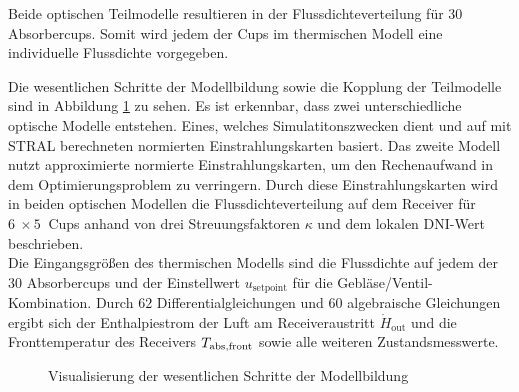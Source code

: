 Beide optischen Teilmodelle resultieren in der Flussdichteverteilung für $30$ Absorbercups.
Somit wird jedem der Cups im thermischen Modell eine individuelle Flussdichte vorgegeben.

Die wesentlichen Schritte der Modellbildung sowie die Kopplung der Teilmodelle sind in Abbildung \ref{fig_ZusammenfassungKopplung} zu sehen.
Es ist erkennbar, dass zwei unterschiedliche optische Modelle entstehen.
Eines, welches Simulatitonszwecken dient und auf mit STRAL berechneten normierten Einstrahlungskarten basiert.
Das zweite Modell nutzt approximierte normierte Einstrahlungskarten, um den Rechenaufwand in dem Optimierungsproblem zu verringern.
Durch diese Einstrahlungskarten wird in beiden optischen Modellen die Flussdichteverteilung auf dem Receiver für $\SI{6}{} \times \SI{5}{}$ Cups anhand von drei Streuungsfaktoren $\kappa$ und dem lokalen DNI-Wert beschrieben.\\
Die Eingangsgrößen des thermischen Modells sind die Flussdichte auf jedem der 30 Absorbercups und der Einstellwert $u_{\mathrm{setpoint}}$ für die Gebläse/Ventil-Kombination.
Durch $62$ Differentialgleichungen und $60$ algebraische Gleichungen ergibt sich der Enthalpiestrom der Luft am Receiveraustritt $\dot{H}_{\mathrm{out}}$ und die Fronttemperatur des Receivers $T_{\mathrm{abs,front}}$ sowie alle weiteren Zustandsmesswerte.

\begin{figure}[p]
    \centering
    \setlength{\fboxsep}{1pt}
    \setlength{\fboxrule}{1pt}
    \caption[Visualisierung der wesentlichen Schritte der Modellbildung]{Visualisierung der wesentlichen Schritte der Modellbildung}
    \label{fig_ZusammenfassungKopplung}
\end{figure}
